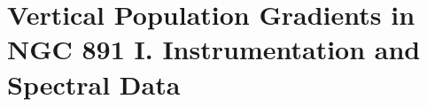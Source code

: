 


\chapter[NGC 891 Data]{Vertical Population Gradients in NGC 891 I. Instrumentation and Spectral Data}
\label{chap:891_1}

\cleardoublepage

